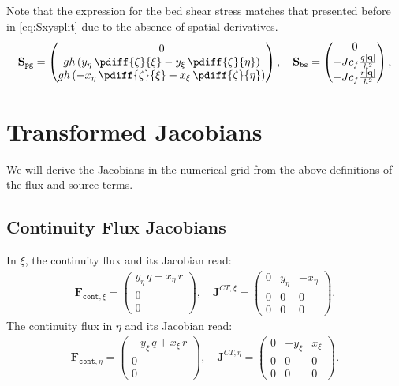 Note that the expression for the bed shear stress matches that presented before in \autoref{eq:Sxysplit} due to the absence of spatial derivatives.
%
\begin{align}
	\mathbf{S}_{\texttt{pg}}=
	\begin{pmatrix}
		0\\
		g h \left( y_{\eta}\, \pdiff{\zeta}{\xi} - y_{\xi}\, \pdiff{\zeta}{\eta} \right)\\
		g h \left( -x_{\eta}\, \pdiff{\zeta}{\xi} + x_{\xi}\, \pdiff{\zeta}{\eta} \right)
	\end{pmatrix},
	\quad
	\mathbf{S}_{\texttt{bs}}=
	\begin{pmatrix}
		0 \\
		- J c_f \frac{q|\mathbf{q}|}{h^2} \\
		- J c_f \frac{r|\mathbf{q}|}{h^2}
	\end{pmatrix},
\end{align}
\section{Transformed Jacobians}
We will derive the Jacobians in the numerical grid from the above definitions of the flux and source terms.
\subsection{Continuity Flux Jacobians}
In $\xi$, the continuity flux and its Jacobian read:
%
\begin{align}
	\mathbf{F}_{\texttt{cont},\xi}=
	\begin{pmatrix}
		y_{\eta}\, q - x_{\eta}\, r\\
		0\\
		0
	\end{pmatrix}, \quad
	\mathbf{J}^{CT,\xi}=
	\begin{pmatrix}
		0 & y_{\eta} & -x_{\eta}\\
		0
		& 0
		& 0\\
		0
		& 0
		& 0
	\end{pmatrix}.
\end{align}
%
The continuity flux in $\eta$ and its Jacobian read:
%
\begin{align}
	\mathbf{F}_{\texttt{cont},\eta}=
	\begin{pmatrix}
		-y_{\xi}\, q + x_{\xi}\, r\\
		0 \\
		0
	\end{pmatrix}, \quad
	\mathbf{J}^{CT,\eta}=
	\begin{pmatrix}
		0 & -y_{\xi} &  x_{\xi}\\
		0
		& 0
		& 0\\
		0
		& 0
		& 0
	\end{pmatrix}.
\end{align}
